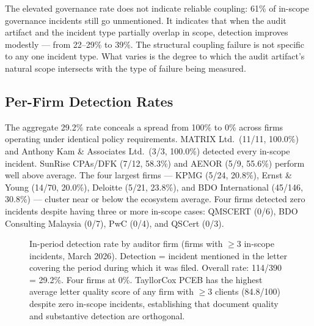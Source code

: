 \documentclass[10pt,twocolumn,letterpaper]{article}
\begin{document}
The elevated governance rate does not indicate reliable coupling: 61\%
of in-scope governance incidents still go unmentioned. It indicates
that when the audit artifact and the incident type partially overlap in
scope, detection improves modestly --- from 22--29\% to 39\%. The
structural coupling failure is not specific to any one incident type.
What varies is the degree to which the audit artifact's natural scope
intersects with the type of failure being measured.

\subsection{Per-Firm Detection Rates}
\label{sec:detection-firms}

The aggregate 29.2\% rate conceals a spread from 100\% to 0\% across
firms operating under identical policy requirements.
MATRIX Ltd.\ (11/11, 100.0\%) and Anthony Kam \& Associates Ltd.\
(3/3, 100.0\%) detected every in-scope incident. SunRise CPAs/DFK
(7/12, 58.3\%) and AENOR (5/9, 55.6\%) perform well above average.
The four largest firms --- KPMG (5/24, 20.8\%), Ernst \& Young
(14/70, 20.0\%), Deloitte (5/21, 23.8\%), and BDO International
(45/146, 30.8\%) --- cluster near or below the ecosystem average.
Four firms detected zero incidents despite having three or more
in-scope cases: QMSCERT (0/6), BDO Consulting Malaysia (0/7),
PwC (0/4), and QSCert (0/3).

\begin{figure}[t]
\centering
{}
\caption{In-period detection rate by auditor firm (firms with $\geq 3$
in-scope incidents, March 2026). Detection = incident mentioned in the
letter covering the period during which it was filed. Overall rate:
114/390 = 29.2\%. Four firms at 0\%. TayllorCox PCEB has the highest average
letter quality score of any firm with $\geq 3$ clients (84.8/100)
despite zero in-scope incidents, establishing that document quality and
substantive detection are orthogonal.}
\label{fig:detection}
\end{figure}
\end{document}
